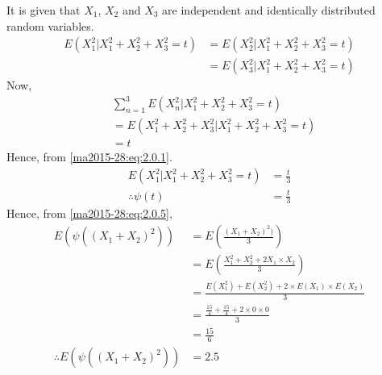 It is given that $X_1$, $X_2$ and $X_3$ are independent and identically distributed random variables.
\begin{align}
    \nonumber E\left(X^2_1 | X_1^2 + X_2^2 + X_3^2 = t\right) &= 
    E\left(X^2_2 | X_1^2 + X_2^2 + X_3^2 = t\right)\\ &= 
    E\left(X^2_3 | X_1^2 + X_2^2 + X_3^2 = t\right)\label{ma2015-28:eq:2.0.1}
\end{align}
Now,
\begin{align}
   \nonumber &\sum_{n=1}^3 E\left(X^2_n | X_1^2 + X_2^2 + X_3^2 = t\right)\\ &= E\left(X_1^2 + X_2^2 + X_3^2 | X_1^2 + X_2^2 + X_3^2 = t\right)\\
   &= t
\end{align}
Hence, from \eqref{ma2015-28:eq:2.0.1}.
\begin{align}
     E\left(X^2_1 | X_1^2 + X_2^2 + X_3^2 = t\right) &= \frac{t}{3}\\
     \therefore \psi(t) &= \frac{t}{3}\label{ma2015-28:eq:2.0.5}
\end{align}
Hence, from \eqref{ma2015-28:eq:2.0.5},
\begin{align}
    E(\psi((X_1+X_2)^2)) &= E\left(\frac{(X_1+X_2)^2)}{3}\right)\\
    &= E\left(\frac{X_1^2 + X_2^2 + 2X_1\times X_2}{3}\right)\\
    &= \frac{E(X_1^2) + E(X_2^2) + 2\times E(X_1) \times E(X_2)}{3}\\
    &= \frac{\frac{15}{4}+\frac{15}{4}+ 2\times0\times0}{3}\\
    &= \frac{15}{6}\\
    \therefore E(\psi((X_1+X_2)^2)) &= 2.5
\end{align}
